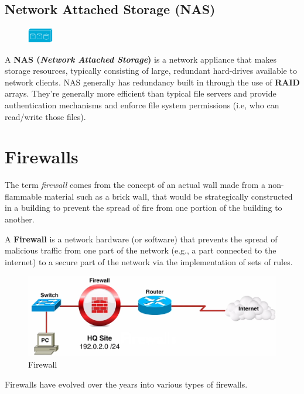 \subsection{Network Attached Storage (NAS)}
\begin{figure}
	\centering
	\vspace{-10pt}
	\includegraphics[width=0.1\textwidth]{"Mod1/chapters/1.2.b Network Icons/1.2.b.12 NAS"}
	\vspace{-10pt}
\end{figure}
A \textbf{NAS (\textit{Network Attached Storage})} is a network appliance that makes storage resources, typically consisting of large, redundant hard-drives available to network clients. NAS generally has redundancy built in through the use of \textbf{RAID} arrays. They're generally more efficient than typical file servers and provide authentication mechanisms and enforce file system permissions (i.e, who can read/write those files). 

\section{Firewalls}
The term \textit{firewall} comes from the concept of an actual wall made from a non-flammable material such as a brick wall, that would be strategically constructed in a building to prevent the spread of fire from one portion of the building to another. 

\noindent
A \textbf{Firewall} is a network hardware (or software) that prevents the spread of malicious traffic from one part of the network (e.g., a part connected to the internet) to a secure part of the network via the implementation of sets of rules. 
\begin{figure}[H]
	\centering
	\includegraphics[width=0.7\linewidth]{"Mod1/chapters/1.2.c Firewall"}
	\caption{Firewall}
	\label{fig:firewall}
\end{figure}
\vspace{-15pt}
\noindent
Firewalls have evolved over the years into various types of firewalls.

